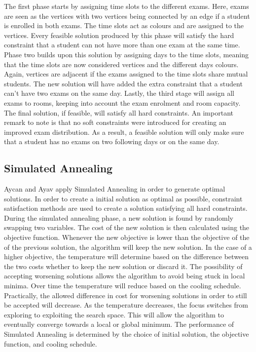 The first phase starts by assigning time slots to the different exams. Here, exams are seen as the vertices with two vertices being connected by an edge if a student is enrolled in both exams. The time slots act as colours and are assigned to the vertices. Every feasible solution produced by this phase will satisfy the hard constraint that a student can not have more than one exam at the same time. Phase two builds upon this solution by assigning days to the time slots, meaning that the time slots are now considered vertices and the different days colours. Again, vertices are adjacent if the exams assigned to the time slots share mutual students. The new solution will have added the extra constraint that a student can't have two exams on the same day. Lastly, the third stage will assign all exams to rooms, keeping into account the exam enrolment and room capacity. The final solution, if feasible, will satisfy all hard constraints. An important remark to note is that no soft constraints were introduced for creating an improved exam distribution. As a result, a feasible solution will only make sure that a student has no exams on two following days or on the same day.


\subsection{Simulated Annealing}

Aycan and Ayav \cite{aycan2009} apply Simulated Annealing in order to generate optimal solutions. In order to create a initial solution as optimal as possible, constraint satisfaction methods are used to create a solution satisfying all hard constraints. During the simulated annealing phase, a new solution is found by randomly swapping two variables. The cost of the new solution is then calculated using the objective function. Whenever the new objective is lower than the objective of the of the previous solution, the algorithm will keep the new solution. In the case of a higher objective, the temperature will determine based on the difference between the two costs whether to keep the new solution or discard it. The possibility of accepting worsening solutions allows the algorithm to avoid being stuck in local minima. Over time the temperature will reduce based on the cooling schedule. Practically, the allowed difference in cost for worsening solutions in order to still be accepted will decrease. As the temperature decreases, the focus switches from exploring to exploiting the search space. This will allow the algorithm to eventually converge towards a local or global minimum. The performance of Simulated Annealing is determined by the choice of initial solution, the objective function, and cooling schedule. 

